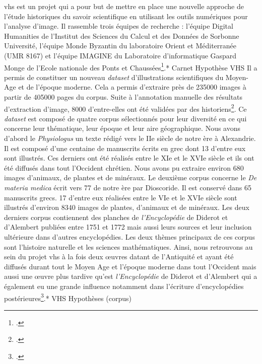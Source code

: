 \gls{vhs} est un projet qui a pour but de mettre en place une nouvelle approche de l'étude historiques du savoir scientifique en utilisant les outils numériques pour l'analyse d'image. Il rassemble trois équipes de recherche : l'équipe Digital Humanities de l'Institut des Sciences du Calcul et des Données de Sorbonne Université, l'équipe Monde Byzantin du laboratoire Orient et Méditerranée (UMR 8167) et l'équipe IMAGINE du Laboratoire d'informatique Gaspard Monge de l'Ecole nationale des Ponts et Chaussées\footcite{Presentation}.* Carnet Hypothèse VHS Il a permis de constituer un nouveau \textit{dataset} d'illustrations scientifiques du Moyen-Age et de l'époque moderne. Cela a permis d'extraire près de 235000 images à partir de 405000 pages du corpus. Suite à l'annotation manuelle des résultats d'extraction d'image, 8000 d'entre-elles ont été validées par des historiens\footcite{fouadComputerVisionHistorical2023}. Ce \textit{dataset} est composé de quatre corpus sélectionnés pour leur diversité en ce qui concerne leur thématique, leur époque et leur aire géographique. 
Nous avons d'abord le \textit{Physiologus} un texte rédigé vers le IIe siècle de notre ère à Alexandrie. Il est composé d'une centaine de manuscrits écrits en grec dont 13 d'entre eux sont illustrés. Ces derniers ont été réalisés entre le XIe et le XVIe siècle et ils ont été diffusés dans tout l'Occident chrétien. Nous avons pu extraire environ 680 images d'animaux, de plantes et de minéraux. 
Le deuxième corpus concerne le \textit{De materia medica} écrit vers 77 de notre ère par Dioscoride. Il est conservé dans 65 manuscrits grecs. 17 d'entre eux réalisées entre le VIe et le XVIe siècle sont illustrés d'environ 8340 images de plantes, d'animaux et de minéraux. 
Les deux derniers corpus contiennent des planches de \textit{l'Encyclopédie} de Diderot et d'Alembert publiées entre 1751 et 1772 mais aussi leurs sources et leur inclusion ultérieure dans d'autres encyclopédies. Les deux thèmes principaux de ces corpus sont l'histoire naturelle et les sciences mathématiques. 
Ainsi, nous retrouvons au sein du projet \gls{vhs} à la fois deux œuvres datant de l'Antiquité et ayant été diffusés durant tout le Moyen Age et l'époque moderne dans tout l'Occident mais aussi une œuvre plus tardive qu'est \textit{l'Encyclopédie} de Diderot et d'Alembert qui a également eu une grande influence notamment dans l'écriture d'encyclopédies postérieures\footcite{Corpus}.* VHS Hypothèses (corpus)




